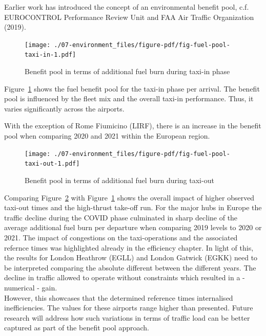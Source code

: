 \documentclass[
  a4paper,
  DIV=11,
  numbers=noendperiod]{scrreprt}
\begin{document}
Earlier work has introduced the concept of an environmental benefit
pool, c.f. EUROCONTROL Performance Review Unit and FAA Air Traffic
Organization (2019).

\begin{figure}[h]

{\centering \texttt{[image: ./07-environment\_files/figure-pdf/fig-fuel-pool-taxi-in-1.pdf]}

}

\caption{\label{fig-fuel-pool-taxi-in}Benefit pool in terms of
additional fuel burn during taxi-in phase}

\end{figure}

Figure~\ref{fig-fuel-pool-taxi-in} shows the fuel benefit pool for the
taxi-in phase per arrival. The benefit pool is influenced by the fleet
mix and the overall taxi-in performance. Thus, it varies significantly
across the airports.

With the exception of Rome Fiumicino (LIRF), there is an increase in the
benefit pool when comparing 2020 and 2021 within the European region.

\begin{figure}[h]

{\centering \texttt{[image: ./07-environment\_files/figure-pdf/fig-fuel-pool-taxi-out-1.pdf]}

}

\caption{\label{fig-fuel-pool-taxi-out}Benefit pool in terms of
additional fuel burn during taxi-out}

\end{figure}

Comparing Figure~\ref{fig-fuel-pool-taxi-out} with
Figure~\ref{fig-fuel-pool-taxi-in} shows the overall impact of higher
observed taxi-out times and the high-thrust take-off run. For the major
hubs in Europe the traffic decline during the COVID phase culminated in
sharp decline of the average additional fuel burn per departure when
comparing 2019 levels to 2020 or 2021. The impact of congestions on the
taxi-operations and the associated refernce times was highlighted
already in the efficiency chapter. In light of this, the results for
London Heathrow (EGLL) and London Gatwick (EGKK) need to be interpreted
comparing the absolute different between the different years. The
decline in traffic allowed to operate without constraints which resulted
in a - numerical - gain.\\
However, this showcases that the determined reference times internalised
inefficiencies. The values for these airports range higher than
presented. Future research will address how such variations in terms of
traffic load can be better captured as part of the benefit pool
approach.
\end{document}
